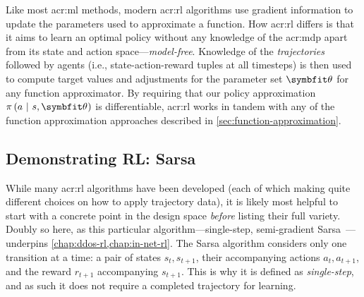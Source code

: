 Like most \gls{acr:ml} methods, modern \gls{acr:rl} algorithms use gradient information to update the parameters used to approximate a function.
How \gls{acr:rl} differs is that it aims to learn an optimal policy without any knowledge of the \gls{acr:mdp} apart from its state and action space---\emph{model-free}.
Knowledge of the \emph{trajectories} followed by agents (i.e., state-action-reward tuples at all timesteps) is then used to compute target values and adjustments for the parameter set $\wvec{}$ for any function approximator.
By requiring that our policy approximation $\pi\left(a~|~s, \wvec{} \right)$ is differentiable, \gls{acr:rl} works in tandem with any of the function approximation approaches described in \cref{sec:function-approximation}.


\subsection{Demonstrating RL: Sarsa}\label{sec:demo-rl-sarsa}
While many \gls{acr:rl} algorithms have been developed (each of which making quite different choices on how to apply trajectory data), it is likely most helpful to start with a concrete point in the design space \emph{before} listing their full variety.
Doubly so here, as this particular algorithm---single-step, semi-gradient Sarsa~\parencite[pp. \numrange{217}{221}]{RL2E}---underpins \cref{chap:ddos-rl,chap:in-net-rl}.
The Sarsa algorithm considers only one transition at a time: a pair of states $s_t,s_{t+1}$, their accompanying actions $a_t,a_{t+1}$, and the reward $r_{t+1}$ accompanying $s_{t+1}$.
This is why it is defined as \emph{single-step}, and as such it does not require a completed trajectory for learning.

